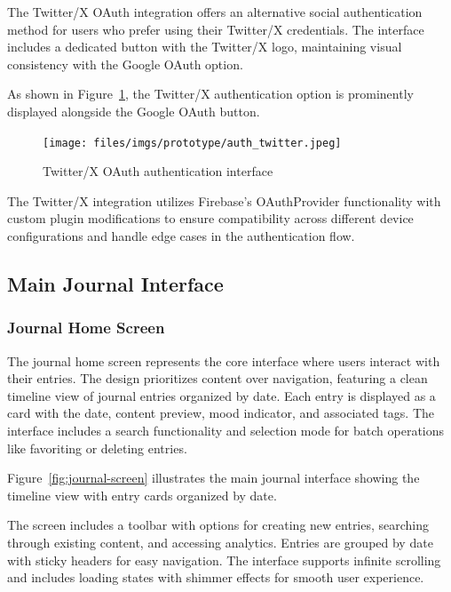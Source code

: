 The Twitter/X OAuth integration offers an alternative social authentication method for users who prefer using their Twitter/X credentials. The interface includes a dedicated button with the Twitter/X logo, maintaining visual consistency with the Google OAuth option.

As shown in Figure~\ref{fig:twitter-oauth}, the Twitter/X authentication option is prominently displayed alongside the Google OAuth button.

 \begin{figure}[H]
 \centering
 \texttt{[image: files/imgs/prototype/auth\_twitter.jpeg]}
 \caption{Twitter/X OAuth authentication interface}
 \label{fig:twitter-oauth}
 \end{figure}

The Twitter/X integration utilizes Firebase's OAuthProvider functionality with custom plugin modifications to ensure compatibility across different device configurations and handle edge cases in the authentication flow.

\subsection{Main Journal Interface}

\subsubsection{Journal Home Screen}

The journal home screen represents the core interface where users interact with their entries. The design prioritizes content over navigation, featuring a clean timeline view of journal entries organized by date. Each entry is displayed as a card with the date, content preview, mood indicator, and associated tags. The interface includes a search functionality and selection mode for batch operations like favoriting or deleting entries.

Figure~\ref{fig:journal-screen} illustrates the main journal interface showing the timeline view with entry cards organized by date.


The screen includes a toolbar with options for creating new entries, searching through existing content, and accessing analytics. Entries are grouped by date with sticky headers for easy navigation. The interface supports infinite scrolling and includes loading states with shimmer effects for smooth user experience.

